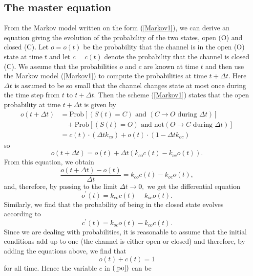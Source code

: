 \subsection{The master equation \label{master_equation}}

From the Markov model written on the form (\ref{Markov1}), we can derive an equation
giving the evolution of the probability of the two states, open (O) and closed (C). Let $o=o(t)$ be the
probability that the channel is in the open (O) state at time $t$ and let $c=c(t)$ denote
the probability that the channel is closed (C). We assume that the probabilities $o$ and $c$ are known at time
$t$ and then use the Markov model (\ref{Markov1}) to compute the probabilities at time $t+\Delta t$.
 Here $\Delta t$ is assumed to be so small that the channel changes state at most once during the time step from $t$ to $t+\Delta t$.   Then the scheme (\ref{Markov1}) states that
the open probability at time $t+\Delta t$ is given by%
\begin{align}
o(t+\Delta t) &= \text{Prob}\left[  (S(t)=C)  \mbox{\ and\ }  (C\rightarrow O \mbox{\ during\ } \Delta t)  \right] \\
& \ \ \ \ + \text{Prob}\left[  (S(t)=O)  \mbox{\ and not}  (O\rightarrow C \mbox{\ during\ } \Delta t)  \right] \\
&= c(t) \cdot (\Delta t k_{co}) + o(t) \cdot (1 -\Delta t k_{oc})
\end{align}
so
\[
o(t+\Delta t)=o(t)+\Delta t ( k_{co}c(t)-k_{oc}o(t)).
\]
From this equation, we obtain
\[
\frac{o(t+\Delta t)-o(t)}{\Delta t}=k_{co}c(t)-k_{oc}o(t),
\]
and, therefore, by passing to the limit $\Delta t\rightarrow0,$ we get the
differential equation%
\begin{equation}
o^{\prime}(t)=k_{co}c(t)-k_{oc}o(t).\label{po}%
\end{equation}
Similarly, we find that the probability of being in the closed state evolves
according to%
\begin{equation}
c^{\prime}(t)=k_{oc}o(t)-k_{co}c(t).\label{pc}%
\end{equation}
Since we are dealing with probabilities, it is reasonable to assume that the
initial conditions add up to one (the channel is either open or closed) and therefore, by adding the equations
above, we find that%
\[
o(t)+c(t)=1
\]
for all time. Hence the variable $c$ in $\left(  \ref{po}\right)  $ can be
